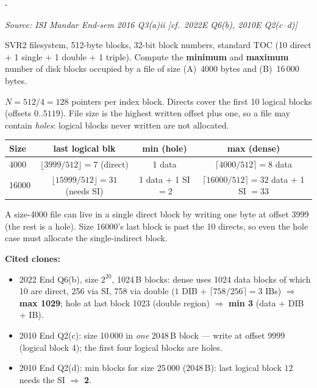 \documentclass[11pt,a4paper]{article}
\makeatletter
\newcommand{\keepspace}[1]{\par\penalty-100\begingroup
  \setlength{\dimen@}{#1}\dimen@ii\pagegoal\advance\dimen@ii-\pagetotal
  \ifdim\dimen@>\dimen@ii\ifdim\dimen@ii>\z@\vfil\fi\break\fi\endgroup}
\newcounter{qn}[section]
\newenvironment{Qn}[4]{%
  \refstepcounter{qn}\keepspace{7\baselineskip}%
  \begin{tcolorbox}[qboxstyle, title={Q\thesection.\theqn\ \ [#1 \textbar\ #2]\ \ #4}]%
  {\footnotesize\color{g3}\textit{Source: #3}}\par\smallskip%
}{%
  \end{tcolorbox}%
}
\newenvironment{Sol}{%
  \begin{tcolorbox}[sboxstyle, title={Solution}]%
}{%
  \end{tcolorbox}\vspace{0.35em}%
}
\makeatother
\begin{document}
\begin{Qn}{Hard}{Lect 24}{ISI Mandar End-sem 2016 Q3(a)ii [cf.\ 2022E Q6(b), 2010E Q2(c--d)]}{Min and max blocks for a given size (holes)}
SVR2 filesystem, 512-byte blocks, 32-bit block numbers, standard TOC
(10 direct $+$ 1 single $+$ 1 double $+$ 1 triple). Compute the
\textbf{minimum} and \textbf{maximum} number of disk blocks occupied by
a file of size (A)~4000 bytes and (B)~16\,000 bytes.
\end{Qn}
\begin{Sol}
$N=512/4=128$ pointers per index block. Directs cover the first 10
logical blocks (offsets $0..5119$). File size is the highest written
offset plus one, so a file may contain \emph{holes}: logical blocks
never written are not allocated.
\begin{center}
\begin{tabular}{lccc}
\hline
Size & last logical blk & min (hole) & max (dense) \\
\hline
4000  & $\lfloor 3999/512\rfloor=7$  (direct) & 1 data &
  $\lceil 4000/512\rceil=8$ data \\
16000 & $\lfloor 15999/512\rfloor=31$ (needs SI) &
  1 data $+$ 1 SI $=2$ &
  $\lceil 16000/512\rceil=32$ data $+$ 1 SI $=33$ \\
\hline
\end{tabular}
\end{center}
A size-4000 file can live in a single direct block by writing one byte
at offset 3999 (the rest is a hole). Size 16000's last block is past
the 10 directs, so even the hole case must allocate the single-indirect
block.

\textbf{Cited clones:}
\begin{itemize}
\item 2022 End Q6(b), size $2^{20}$, 1024\,B blocks: dense uses 1024
      data blocks of which 10 are direct, 256 via SI, 758 via double
      ($1$ DIB $+\;\lceil 758/256\rceil=3$ IBs) $\Rightarrow$
      \textbf{max 1029}; hole at last block 1023 (double region)
      $\Rightarrow$ \textbf{min 3} (data $+$ DIB $+$ IB).
\item 2010 End Q2(c): size 10\,000 in \emph{one} 2048\,B block --- write
      at offset 9999 (logical block 4); the first four logical blocks
      are holes.
\item 2010 End Q2(d): min blocks for size 25\,000 (2048\,B): last
      logical block $12$ needs the SI $\Rightarrow$ \textbf{2}.
\end{itemize}
\end{Sol}
\end{document}
